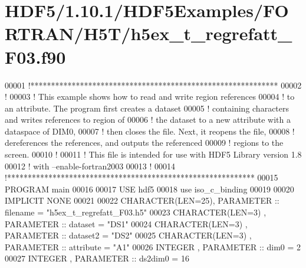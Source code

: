 \hypertarget{_h_d_f5_21_810_81_2_h_d_f5_examples_2_f_o_r_t_r_a_n_2_h5_t_2h5ex__t__regrefatt___f03_8f90_source}{}\section{H\+D\+F5/1.10.1/\+H\+D\+F5\+Examples/\+F\+O\+R\+T\+R\+A\+N/\+H5\+T/h5ex\+\_\+t\+\_\+regrefatt\+\_\+\+F03.f90}
\label{_h_d_f5_21_810_81_2_h_d_f5_examples_2_f_o_r_t_r_a_n_2_h5_t_2h5ex__t__regrefatt___f03_8f90_source}

\begin{DoxyCode}
00001 \textcolor{comment}{!************************************************************}
00002 \textcolor{comment}{!}
00003 \textcolor{comment}{!  This example shows how to read and write region references}
00004 \textcolor{comment}{!  to an attribute.  The program first creates a dataset}
00005 \textcolor{comment}{!  containing characters and writes references to region of}
00006 \textcolor{comment}{!  the dataset to a new attribute with a dataspace of DIM0,}
00007 \textcolor{comment}{!  then closes the file.  Next, it reopens the file,}
00008 \textcolor{comment}{!  dereferences the references, and outputs the referenced}
00009 \textcolor{comment}{!  regions to the screen.}
00010 \textcolor{comment}{!}
00011 \textcolor{comment}{!  This file is intended for use with HDF5 Library version 1.8}
00012 \textcolor{comment}{!  with --enable-fortran2003}
00013 \textcolor{comment}{!}
00014 \textcolor{comment}{!************************************************************}
00015 \textcolor{keyword}{PROGRAM} main
00016 
00017   \textcolor{keywordtype}{USE }hdf5
00018   \textcolor{keywordtype}{use }iso\_c\_binding
00019 
00020   \textcolor{keywordtype}{IMPLICIT NONE}
00021 
00022   \textcolor{keywordtype}{CHARACTER(LEN=25)}, \textcolor{keywordtype}{PARAMETER} :: filename  = \textcolor{stringliteral}{"h5ex\_t\_regrefatt\_F03.h5"}
00023   \textcolor{keywordtype}{CHARACTER(LEN=3)} , \textcolor{keywordtype}{PARAMETER} :: dataset   = \textcolor{stringliteral}{"DS1"}
00024   \textcolor{keywordtype}{CHARACTER(LEN=3)} , \textcolor{keywordtype}{PARAMETER} :: dataset2  = \textcolor{stringliteral}{"DS2"}
00025   \textcolor{keywordtype}{CHARACTER(LEN=3)} , \textcolor{keywordtype}{PARAMETER} :: attribute = \textcolor{stringliteral}{"A1"}
00026   \textcolor{keywordtype}{INTEGER}          , \textcolor{keywordtype}{PARAMETER} :: dim0      = 2
00027   \textcolor{keywordtype}{INTEGER}          , \textcolor{keywordtype}{PARAMETER} :: ds2dim0   = 16

\end{DoxyCode}
